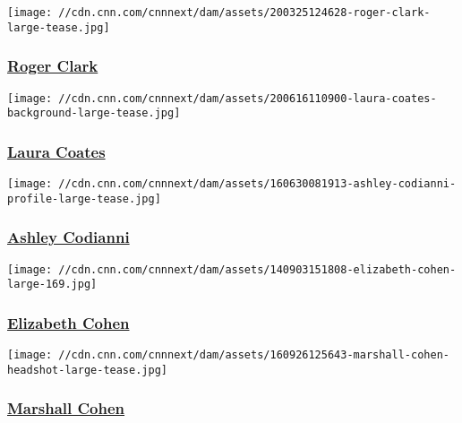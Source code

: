 \href{/profiles/roger-clark}{}

\texttt{[image: //cdn.cnn.com/cnnnext/dam/assets/200325124628-roger-clark-large-tease.jpg]}

\hypertarget{roger-clark}{%
\subsubsection{\texorpdfstring{\href{/profiles/roger-clark}{Roger
Clark}}{Roger Clark}}\label{roger-clark}}

\href{/profiles/laura-coates}{}

\texttt{[image: //cdn.cnn.com/cnnnext/dam/assets/200616110900-laura-coates-background-large-tease.jpg]}

\hypertarget{laura-coates}{%
\subsubsection{\texorpdfstring{\href{/profiles/laura-coates}{Laura
Coates}}{Laura Coates}}\label{laura-coates}}

\href{/profiles/ashley-codianni}{}

\texttt{[image: //cdn.cnn.com/cnnnext/dam/assets/160630081913-ashley-codianni-profile-large-tease.jpg]}

\hypertarget{ashley-codianni}{%
\subsubsection{\texorpdfstring{\href{/profiles/ashley-codianni}{Ashley
Codianni}}{Ashley Codianni}}\label{ashley-codianni}}

\href{/profiles/elizabeth-cohen}{}

\texttt{[image: //cdn.cnn.com/cnnnext/dam/assets/140903151808-elizabeth-cohen-large-169.jpg]}

\hypertarget{elizabeth-cohen}{%
\subsubsection{\texorpdfstring{\href{/profiles/elizabeth-cohen}{Elizabeth
Cohen}}{Elizabeth Cohen}}\label{elizabeth-cohen}}

\href{/profiles/marshall-cohen}{}

\texttt{[image: //cdn.cnn.com/cnnnext/dam/assets/160926125643-marshall-cohen-headshot-large-tease.jpg]}

\hypertarget{marshall-cohen}{%
\subsubsection{\texorpdfstring{\href{/profiles/marshall-cohen}{Marshall
Cohen}}{Marshall Cohen}}\label{marshall-cohen}}

